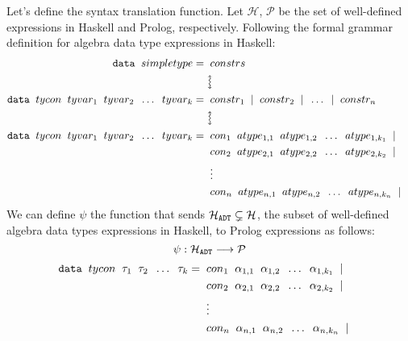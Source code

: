 Let's define the syntax translation function. Let $\mathcal{H}$, $\mathcal{P}$ be the set of well-defined expressions in Haskell and Prolog, respectively. Following the formal grammar definition for algebra data type expressions in Haskell:
\begin{align*}
	\ttt{data} \tav simpletype =                                                & \tav constrs                                                                       &   &   \\
	                                                                            & \updownsquigarrow                                                                  &   &   \\
	\ttt{data} \tav tycon \tav tyvar_1 \tav tyvar_2 \tav \ldots \tav tyvar_k 	= & \tav constr_1 \tav | \tav constr_2 \tav | \tav \ldots \tav | \tav constr_n         &   &   \\
	                                                                            & \updownsquigarrow                                                                  &   &   \\
	\ttt{data} \tav tycon \tav tyvar_1 \tav tyvar_2 \tav \ldots \tav tyvar_k 	= & \tav con_1 \tav atype_{1,1} \tav atype_{1,2} \tav \ldots \tav atype_{1,k_1} \tav | &   &   \\
	                                                                            & \tav con_2 \tav atype_{2,1} \tav atype_{2,2} \tav \ldots \tav atype_{2,k_2} \tav | &   &   \\
	                                                                            & \tav \vdots \tav                                                                   &   &   \\
	                                                                            & \tav con_n \tav atype_{n,1} \tav atype_{n,2} \tav \ldots \tav atype_{n,k_n} \tav | &   &   \\
\end{align*}
We can define $\psi$ the function that sends $\mathcal{H}_{\texttt{ADT}} \subsetneq \mathcal{H}$, the subset of well-defined algebra data types expressions in Haskell, to Prolog expressions as follows: $$\psi: \mathcal{H}_{\texttt{ADT}} \longrightarrow \mathcal{P} $$
\begin{align*}
	\texttt{data} \;\; tycon \;\; \tau_1 \;\; \tau_2 \;\; \ldots \;\; \tau_k 	= & \;\; con_1 \;\; \alpha_{1,1} \;\; \alpha_{1,2} \;\; \ldots \;\; \alpha_{1,k_1} \;\; | &   &   \\
	                                                                         & \;\; con_2 \;\; \alpha_{2,1} \;\; \alpha_{2,2} \;\; \ldots \;\; \alpha_{2,k_2} \;\; | &   &   \\
	                                                                         & \;\; \vdots \;\;                                                                      &   &   \\
	                                                                         & \;\; con_n \;\; \alpha_{n,1} \;\; \alpha_{n,2} \;\; \ldots \;\; \alpha_{n,k_n} \;\; | &   &   \\
\end{align*}
